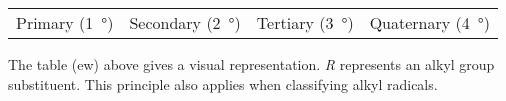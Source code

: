 		\begin{center}\begin{table}[ht]\renewcommand{\arraystretch}{1.4}
		\begin{tabu} to \textwidth {| X[c,m] | X[c,m] | X[c,m] | X[c,m] |}

			\hline
			\vspace{2mm}					\vspace{2mm}	&
			\vspace{2mm}				\vspace{2mm}	&
			\vspace{2mm}			\vspace{2mm}	&
			\vspace{2mm}		\vspace{2mm}	\\

			\hline
			Primary (\SI{1}{\degree})		&
			Secondary (\SI{2}{\degree})		&
			Tertiary (\SI{3}{\degree})		&
			Quaternary (\SI{4}{\degree})	\\
			\hline

		\end{tabu}
		\end{table}\end{center}\vspace{-10mm}

		The table (ew) above gives a visual representation. \textit{R} represents an alkyl group substituent. This principle
		also applies when classifying alkyl radicals.

















